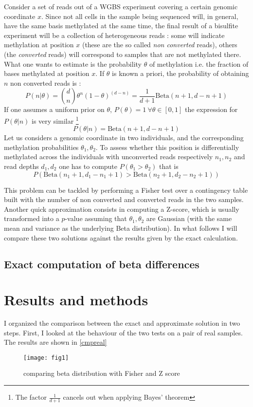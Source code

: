 \documentclass[11pt]{amsart}
\begin{document}
Consider a set of reads out of a WGBS experiment covering a certain genomic coordinate $x$. Since not all cells in the sample being sequenced will, in general,  have the same basis methylated at the same time, the final result of a bisulfite experiment will be a collection of heterogeneous reads : some will indicate methylation at position $x$ (these are the so called {\em non converted} reads), others (the {\em converted} reads) will correspond to samples that are not methylated there. What one wants to estimate is the probability $\theta$ of methylation i.e. the fraction of bases methylated at position $x$.  If $\theta$ is known a priori, the probability of obtaining $n$ non converted reads is :
\[P(n|\theta)={d \choose n}\theta^n ({1-\theta})^(d-n)=\frac{1}{d+1}\mbox{Beta}(n+1,d-n+1)\]
If one assumes a uniform prior on $\theta$, $P(\theta)=1 \ \forall \theta \in [0,1]$ the expression for $P(\theta|n)$ is very similar \footnote{The factor $\frac{1}{d+1}$ cancels out when applying Bayes' theorem}
\[P(\theta|n)=\mbox{Beta}(n+1,d-n+1)\]
Let us considers a genomic coordinate in two individuals, and the corresponding methylation probabilities $\theta_1,\theta_2$. 
To assess whether this position is differentially methylated across the individuals with unconverted reads respectively $n_1,n_2$ and read depths $d_1,d_2$ one
has to compute $P(\theta_1>\theta_2)$ that is \[P(\mbox{Beta}(n_1+1,d_1-n_1+1)>\mbox{Beta}(n_2+1,d_2-n_2+1))\]
 
This problem can be tackled by performing a Fisher test over a contingency table built with the number of non converted and converted reads in the two samples. Another quick approximation consists in computing a Z-score, which is usually transformed into a $p$-value assuming that $\theta_1,\theta_2$ are Gaussian (with the same mean and variance as the underlying Beta distribution). In what follows I will compare these two solutions against the results given by the exact calculation.
 
\subsection{Exact computation of beta differences}

\section{Results and methods} 
I organized the comparison between the exact and approximate solution in two steps. First,
I looked at the behaviour of the two tests on a pair of real samples. The results are shown in \ref{cmpreal}
\begin{figure}[h]
\caption{comparing beta distribution with Fisher and Z score}
\texttt{[image: fig1]}
\end{figure}\label{cmpreal}
\end{document}
